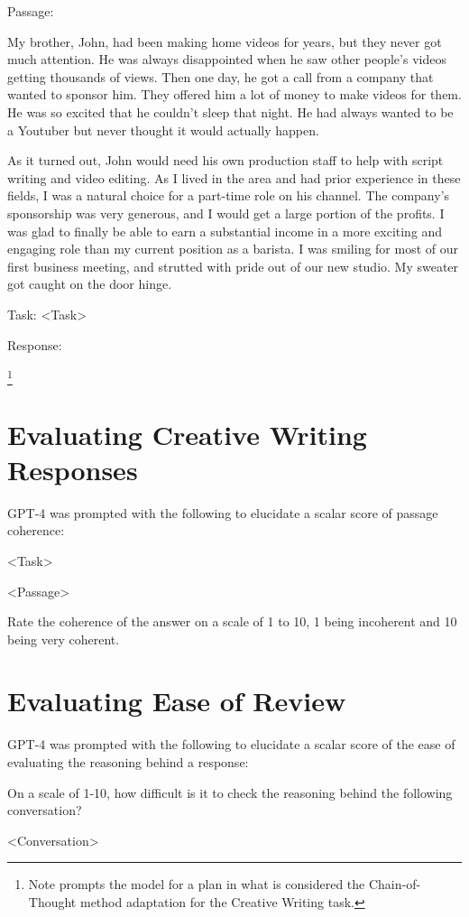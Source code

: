 \documentclass[11pt]{article}
\begin{document}
Passage:

My brother, John, had been making home videos for years, but they never got much attention. He was always disappointed when he saw other people's videos getting thousands of views. Then one day, he got a call from a company that wanted to sponsor him. They offered him a lot of money to make videos for them. He was so excited that he couldn't sleep that night. He had always wanted to be a Youtuber but never thought it would actually happen.

As it turned out, John would need his own production staff to help with script writing and video editing. As I lived in the area and had prior experience in these fields, I was a natural choice for a part-time role on his channel. The company's sponsorship was very generous, and I would get a large portion of the profits. I was glad to finally be able to earn a substantial income in a more exciting and engaging role than my current position as a barista. I was smiling for most of our first business meeting, and strutted with pride out of our new studio. My sweater got caught on the door hinge.

Task: <Task>

Response:

\footnote{Note \citealp{yao_tree_2023} prompts the model for a plan in what is considered the Chain-of-Thought method adaptation for the Creative Writing task.}

\section{Evaluating Creative Writing Responses}
\label{sec:evaluating_creative_writing}

GPT-4 was prompted with the following to elucidate a scalar score of passage coherence:

<Task>

<Passage>

Rate the coherence of the answer on a scale of 1 to 10, 1 being incoherent and 10 being very coherent.

\section{Evaluating Ease of Review}
\label{sec:evaluating_ease_of_review}

GPT-4 was prompted with the following to elucidate a scalar score of the ease of evaluating the reasoning behind a response:

On a scale of 1-10, how difficult is it to check the reasoning behind the following conversation?

<Conversation>
\end{document}
